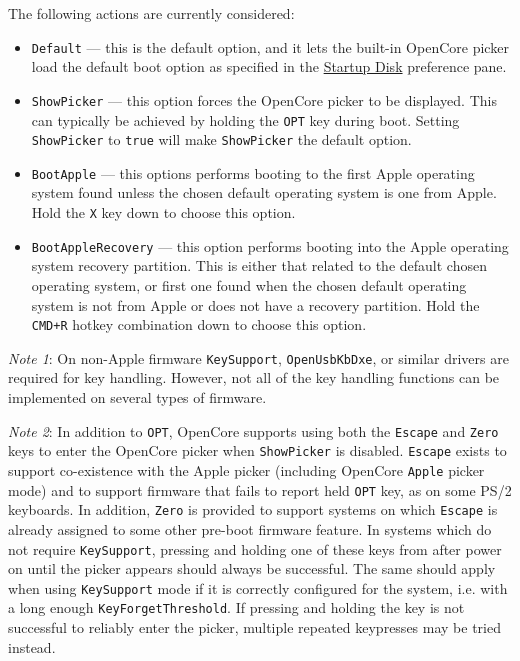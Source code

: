 \documentclass[]{article}
\providecommand{\tightlist}{%
  \setlength{\itemsep}{0pt}\setlength{\parskip}{0pt}}
\begin{document}
\begin{enumerate}
  The following actions are currently considered:

  \begin{itemize}
  \tightlist
  \item \texttt{Default} --- this is the default option, and it lets the built-in OpenCore
  picker load the default boot option as specified in the
  \href{https://support.apple.com/HT202796}{Startup Disk} preference pane.
  \item \texttt{ShowPicker} --- this option forces the OpenCore picker to be displayed. This can
  typically be achieved by holding the \texttt{OPT} key during boot. Setting \texttt{ShowPicker} to
  \texttt{true} will make \texttt{ShowPicker} the default option.
  \item \texttt{BootApple} --- this options performs booting to the first Apple
  operating system found unless the chosen default operating system is one from Apple.
  Hold the \texttt{X} key down to choose this option.
  \item \texttt{BootAppleRecovery} --- this option performs booting into the Apple operating
  system recovery partition. This is either that related to the default chosen operating system,
  or first one found when the chosen default operating system is not from Apple or does not have
  a recovery partition. Hold the \texttt{CMD+R} hotkey combination down to choose this option.
  \end{itemize}

  \emph{Note 1}: On non-Apple firmware \texttt{KeySupport}, \texttt{OpenUsbKbDxe}, or similar drivers are
  required for key handling. However, not all of the key handling functions can be implemented on several
  types of firmware.

  \emph{Note 2}: In addition to \texttt{OPT}, OpenCore supports using both the \texttt{Escape}
  and \texttt{Zero} keys to enter the OpenCore picker when \texttt{ShowPicker} is disabled.
  \texttt{Escape} exists to support co-existence with the Apple picker (including OpenCore \texttt{Apple}
  picker mode) and to support firmware that fails to report held \texttt{OPT} key, as on some PS/2 keyboards.
  In addition, \texttt{Zero} is provided to support systems on which \texttt{Escape} is already assigned to
  some other pre-boot firmware feature. In systems which do not require \texttt{KeySupport}, pressing and
  holding one of these keys from after power on until the picker appears should always be successful. The
  same should apply when using \texttt{KeySupport} mode if it is correctly configured for the system, i.e.
  with a long enough \texttt{KeyForgetThreshold}. If pressing and holding the key is not successful to reliably
  enter the picker, multiple repeated keypresses may be tried instead.


\end{enumerate}
\end{document}
